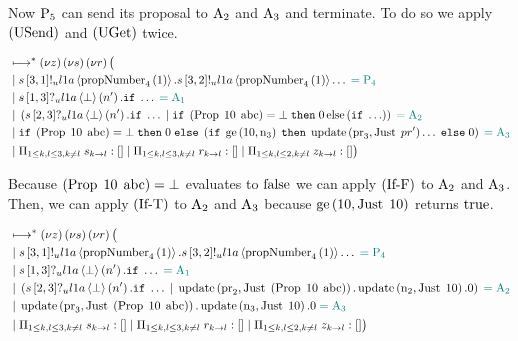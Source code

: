 Now $\Proposer{5}$ can send its proposal to $\Acceptor{2}$ and $\Acceptor{3}$ and terminate.
To do so we apply $\RUsend$ and $\RUget$ twice.

\begin{align*}
&\mapstostar\NuChannels\big (\\
&\Or
\SendUnreliableP{\ChannelS}{3}{1}{\LOneA}{\proposalNumber{1}{4}}.
\SendUnreliableP{\ChannelS}{3}{2}{\LOneA}{\proposalNumber{1}{4}}\ldots
\comment{= \Proposer{4}}\\
&\Or \ReceiveUnreliableP{\ChannelS}{1}{3}{\LOneA}{\bot}{n'}.\mIf \ldots \comment{= \Acceptor{1}}\\
&\Or
    \Paren{
        \ReceiveUnreliableP{\ChannelS}{2}{3}{\LOneA}{\bot}{n'}.\mIf \ldots
        \Or
        \mIf \Paren{\ProposalC{10}{\ABC}} = \bot
        \;\mThen \End
        \Else{\Paren{
            \mIf \ldots
        }}
    } \comment{= \Acceptor{2}}\\
&\Or
    \mIf \Paren{\ProposalC{10}{\ABC}} = \bot
    \;\mThen \End
    \;\mElse \Paren{
        \mIf \greaterEqual{10}{\NumberRegister_3}
        \;\mThen \update{\ProposalRegister_3}{\Just{pr'}}\ldots
        \;\mElse \End
    }
    \comment{= \Acceptor{3}}\\
&\Or \InnerSessionQueues{\ChannelS}
\Or \InnerSessionQueues{\ChannelR}
\Or \OuterSessionQueues
\big )
\end{align*}

Because $\Paren{\ProposalC{10}{\ABC}} = \bot$ evaluates to $\False$ we can apply $\RIfF$ to $\Acceptor{2}$ and $\Acceptor{3}$.
Then, we can apply $\RIfT$ to $\Acceptor{2}$ and $\Acceptor{3}$ because $\greaterEqual{10}{\Just{10}}$ returns $\True$.

\begin{align*}
&\mapstostar\NuChannels\big (\\
&\Or
\SendUnreliableP{\ChannelS}{3}{1}{\LOneA}{\proposalNumber{1}{4}}.
\SendUnreliableP{\ChannelS}{3}{2}{\LOneA}{\proposalNumber{1}{4}}\ldots
\comment{= \Proposer{4}}\\
&\Or \ReceiveUnreliableP{\ChannelS}{1}{3}{\LOneA}{\bot}{n'}.\mIf \ldots \comment{= \Acceptor{1}}\\
&\Or
    \Paren{
        \ReceiveUnreliableP{\ChannelS}{2}{3}{\LOneA}{\bot}{n'}.\mIf \ldots
        \Or
            \update{\ProposalRegister_2}{\Just{\Paren{\ProposalC{10}{\ABC}}}}.
            \update{\NumberRegister_2}{\Just{10}}.
            \End
    } \comment{= \Acceptor{2}}\\
&\Or
    \update{\ProposalRegister_3}{\Just{\Paren{\ProposalC{10}{\ABC}}}}.
    \update{\NumberRegister_3}{\Just{10}}.
    \End
    \comment{= \Acceptor{3}}\\
&\Or \InnerSessionQueues{\ChannelS}
\Or \InnerSessionQueues{\ChannelR}
\Or \OuterSessionQueues
\big )
\end{align*}

